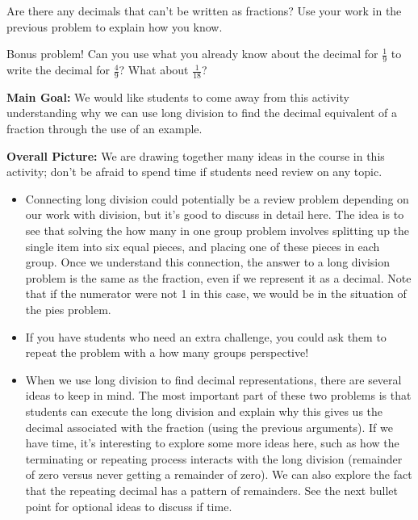 \documentclass[noauthor, nooutcomes, handout]{ximera}
\begin{document}
\begin{problem}
Are there any decimals that can't be written as fractions? Use your work in the previous problem to explain how you know.
\end{problem}



\begin{problem}
Bonus problem! Can you use what you already know about the decimal for $\frac{1}{9}$ to write the decimal for $\frac{4}{9}$? What about $\frac{1}{18}$? 
\end{problem}





 \newpage
\begin{instructorNotes}

{\bf Main Goal:} We would like students to come away from this activity understanding why we can use long division to find the decimal equivalent of a fraction through the use of an example.

{\bf Overall Picture:} We are drawing together many ideas in the course in this activity; don't be afraid to spend time if students need review on any topic.

 \begin{itemize}
 
 \item Connecting long division could potentially be a review problem depending on our work with division, but it's good to discuss in detail here. The idea is to see that solving the how many in one group problem involves splitting up the single item into six equal pieces, and placing one of these pieces in each group. Once we understand this connection, the answer to a long division problem is the same as the fraction, even if we represent it as a decimal. Note that if the numerator were not 1 in this case, we would be in the situation of the pies problem.
 
 \item If you have students who need an extra challenge, you could ask them to repeat the problem with a how many groups perspective!
 
 \item When we use long division to find decimal representations, there are several ideas to keep in mind. The most important part of these two problems is that students can execute the long division and explain why this gives us the decimal associated with the fraction (using the previous arguments). If we have time, it's interesting to explore some more ideas here, such as how the terminating or repeating process interacts with the long division (remainder of zero versus never getting a remainder of zero). We can also explore the fact that the repeating decimal has a pattern of remainders. See the next bullet point for optional ideas to discuss if time.
 

\end{itemize}
\end{instructorNotes}
\end{document}
